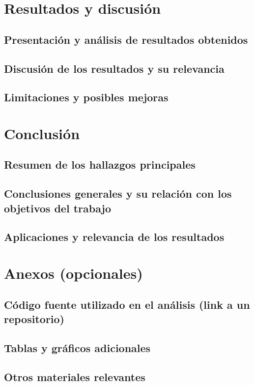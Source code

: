 \documentclass[a4paper]{report}
\begin{document}
\chapter{Resultados y discusión}

\section{Presentación y análisis de resultados obtenidos}

\section{Discusión de los resultados y su relevancia}

\section{Limitaciones y posibles mejoras}





\chapter{Conclusión}

\section{Resumen de los hallazgos principales}

\section{Conclusiones generales y su relación con los objetivos del trabajo}

\section{Aplicaciones y relevancia de los resultados}


\printbibliography[heading=bibintoc] %



\chapter*{Anexos (opcionales)}

\section{Código fuente utilizado en el análisis (link a un repositorio)}
\section{Tablas y gráficos adicionales}
\section{Otros materiales relevantes}
\end{document}
